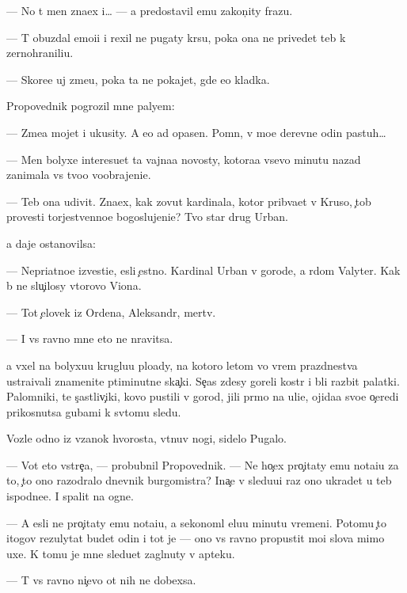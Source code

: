 \documentclass[10pt]{book}
\begin{document}
— No t{\yi} men{\ia} zna{\y}ex i… — {\Y}a predostavil {\y}emu zakon{\c}ity frazu.

— T{\yi} obuzdal emo{\q}i{\y}i i rexil ne pugaty kr{\yi}su, poka ona ne privedet teb{\ia} k zernohranili{\x}u.

— Skore{\y}e uj zme{\y}u, poka ta ne pokajet, gde {\y}e{\y}o kladka.

Propovednik pogrozil mne paly{\q}em:

— Zme{\y}a mojet i ukusity. A {\y}e{\y}o {\y}ad opasen. Pomn{\iu}, v mo{\y}e{\y} derevne odin pastuh…

— Men{\ia} bolyxe interesu{\y}et ta vajna{\y}a novosty, kotora{\y}a vsevo minutu nazad zanimala vs{\e} tvo{\y}o voobrajeni{\y}e.

— Teb{\ia} ona udivit. Zna{\y}ex, kak zovut kardinala, kotor{\yi}{\y} prib{\yi}va{\y}et v Kruso, {\c}tob{\yi} provesti torjestvenno{\y}e bogoslujeni{\y}e? Tvo{\y} star{\yi}{\y} drug Urban.

{\Y}a daje ostanovilsa:

— Nepri{\y}atno{\y}e izvesti{\y}e, {\y}esli {\c}estno. Kardinal Urban v gorode, a r{\ia}dom Valyter. Kak b{\yi} ne slu{\c}ilosy vtorovo Viona.

— Tot {\c}elovek iz Ordena, Aleksandr, mertv.

— I vs{\e} ravno mne eto ne nravitsa.

{\Y}a v{\yi}xel na bolyxu{\y}u kruglu{\y}u plo{\x}ady, na kotoro{\y} letom vo vrem{\ia} prazdnestva ustra{\y}ivali znamenit{\yi}{\y}e p{\ia}timinutn{\yi}{\y}e ska{\c}ki. Se{\y}{\c}as zdesy goreli kostr{\yi} i b{\yi}li razbit{\yi} palatki. Palomniki, te s{\c}astliv{\c}iki, kovo pustili v gorod, jili pr{\ia}mo na uli{\q}e, ojida{\y}a svo{\y}e{\y} o{\c}eredi prikosnutsa gubami k sv{\ia}tomu sledu.

Vozle odno{\y} iz v{\ia}zanok hvorosta, v{\yi}t{\ia}nuv nogi, sidelo Pugalo.

— Vot eto vstre{\c}a, — probubnil Propovednik. — Ne ho{\c}ex pro{\c}itaty {\y}emu nota{\q}i{\y}u za to, {\c}to ono razodralo dnevnik burgomistra? Ina{\c}e v sledu{\y}u{\x}i{\y} raz ono ukradet u teb{\ia} ispodne{\y}e. I spalit na ogne.

— A {\y}esli ne pro{\c}itaty {\y}emu nota{\q}i{\y}u, {\y}a sekonoml{\iu} {\q}elu{\y}u minutu vremeni. Potomu {\c}to itogov{\yi}{\y} rezulytat budet odin i tot je — ono vs{\e} ravno propustit mo{\y}i slova mimo uxe{\y}. K tomu je mne sledu{\y}et zagl{\ia}nuty v apteku.

— T{\yi} vs{\e} ravno ni{\c}evo ot nih ne dob{\y}exsa.
\end{document}
